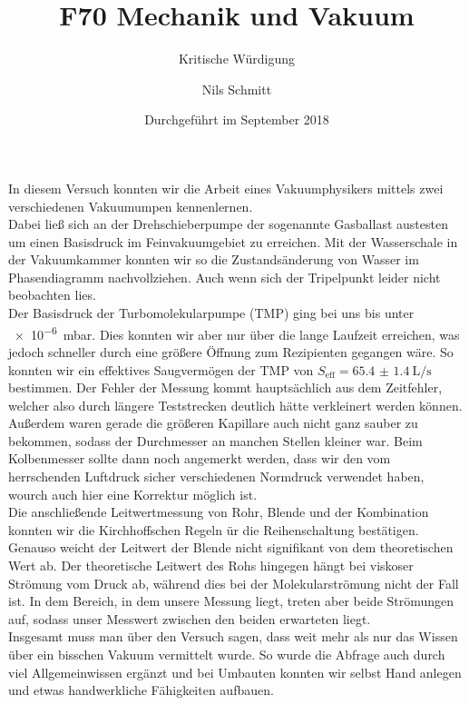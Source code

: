 \documentclass[12pt,
				 a4paper,
				numbers=endperiod
				 ]{scrartcl}
\title{F70 Mechanik und Vakuum}
\subtitle{Kritische Würdigung}
\author{Nils Schmitt}
\date{Durchgeführt im September 2018}
\begin{document}
\maketitle
In diesem Versuch konnten wir die Arbeit eines Vakuumphysikers mittels zwei verschiedenen Vakuumumpen kennenlernen.\\

Dabei ließ sich an der Drehschieberpumpe der sogenannte Gasballast austesten um einen Basisdruck im Feinvakuumgebiet zu erreichen.
Mit der Wasserschale in der Vakuumkammer konnten wir so die Zustandsänderung von Wasser im Phasendiagramm nachvollziehen.
Auch wenn sich der Tripelpunkt leider nicht beobachten lies.\\
Der Basisdruck der Turbomolekularpumpe (TMP) ging bei uns bis unter \SI{e-6}{\milli\bar}.
Dies konnten wir aber nur über die lange Laufzeit erreichen, was jedoch schneller durch eine größere Öffnung zum Rezipienten gegangen wäre.
So konnten wir ein effektives Saugvermögen der TMP von $S_{\text{eff}}=\SI{65.4(14)}{\liter\per\second}$ bestimmen.
Der Fehler der Messung kommt hauptsächlich aus dem Zeitfehler, welcher also durch längere Teststrecken deutlich hätte verkleinert werden können.
Außerdem waren gerade die größeren Kapillare auch nicht ganz sauber zu bekommen, sodass der Durchmesser an manchen Stellen kleiner war.
Beim Kolbenmesser sollte dann noch angemerkt werden, dass wir den vom herrschenden Luftdruck sicher verschiedenen Normdruck verwendet haben, wourch auch hier eine Korrektur möglich ist.\\

Die anschließende Leitwertmessung von Rohr, Blende und der Kombination konnten wir die Kirchhoffschen Regeln ür die Reihenschaltung bestätigen.
Genauso weicht der Leitwert der Blende nicht signifikant von dem theoretischen Wert ab.
Der theoretische Leitwert des Rohs hingegen hängt bei viskoser Strömung vom Druck ab, während dies bei der Molekularströmung nicht der Fall ist.
In dem Bereich, in dem unsere Messung liegt, treten aber beide Strömungen auf, sodass unser Messwert zwischen den beiden erwarteten liegt.\\

Insgesamt muss man über den Versuch sagen, dass weit mehr als nur das Wissen über ein bisschen Vakuum vermittelt wurde.
So wurde die Abfrage auch durch viel Allgemeinwissen ergänzt und bei Umbauten konnten wir selbst Hand anlegen und etwas handwerkliche Fähigkeiten aufbauen. 
\end{document}
